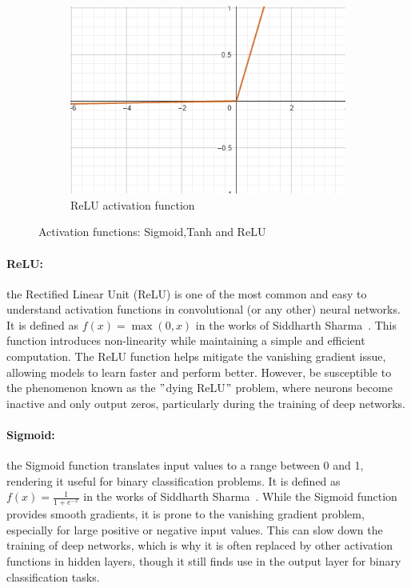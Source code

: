 \begin{figure}[h!]
\begin{subfigure}[b]{0.45\textwidth}
        \includegraphics[width=\textwidth]{figures/relu}
        \caption{ReLU activation function}
        \label{fig:relu}
    \end{subfigure}

    \caption{Activation functions: Sigmoid,Tanh and ReLU}
    \label{fig:activation_functions}
\end{figure}


\paragraph{ReLU:}\label{par:relu}
the Rectified Linear Unit (ReLU) is one of the most common and easy to understand activation functions in convolutional (or any other) neural networks.
It is defined as \( f(x) = \max(0, x) \) in the works of Siddharth Sharma~\cite{sharma2017activation}.
This function introduces non-linearity while maintaining a simple and efficient computation.
The ReLU function helps mitigate the vanishing gradient issue, allowing models to learn faster and perform better.
However, be susceptible to the phenomenon known as the \("\)dying ReLU\("\) problem, where neurons become inactive and only output zeros,
particularly during the training of deep networks.



\paragraph{Sigmoid:}\label{par:sigmoid}
the Sigmoid function translates input values to a range between 0 and 1,
rendering it useful for binary classification problems.
It is defined as \( f(x) = \frac{1}{1 + e^{-x}} \) in the works of Siddharth Sharma~\cite{sharma2017activation}.
While the Sigmoid function provides smooth gradients,
it is prone to the vanishing gradient problem,
especially for large positive or negative input values.
This can slow down the training of deep networks,
which is why it is often replaced by other activation
functions in hidden layers,
though it still finds use in the output layer for binary classification tasks.



